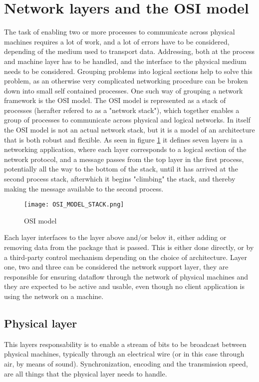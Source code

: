 \section{Network layers and the OSI model}
The task of enabling two or more processes to communicate across physical machines requires a lot of work, and a lot of errors have to be considered, depending of the medium used to transport data. Addressing, both at the process and machine layer has to be handled, and the interface to the physical medium needs to be considered. Grouping problems into logical sections help to solve this problem, as an otherwise very complicated networking procedure can be broken down into small self contained processes.
One such way of grouping a network framework is the OSI model. The OSI model is represented as a stack of processes (herafter refered to as a "network stack"), which together enables a group of processes to communicate across physical and logical networks.
In itself the OSI model is not an actual network stack, but it is a model of an architecture that is both robust and flexible. 
As seen in figure \ref{fig:osi_model_stack} it defines seven layers in a networking application, where each layer corresponds to a logical section of the network protocol, and a message passes from the top layer in the first process, potentially all the way to the bottom of the stack, until it has arrived at the second process stack, afterwhich it begins "climbing" the stack, and thereby making the message available to the second process.
\begin{figure}[htb]
	\begin{center}
	\texttt{[image: OSI\_MODEL\_STACK.png]} %
	\caption{OSI model}
	\label{fig:osi_model_stack}			%
	\end{center}
\end{figure}
Each layer interfaces to the layer above and/or belov it, either adding or removing data from the package that is passed. This is either done directly, or by a third-party control mechanism depending on the choice of architecture.
Layer one, two and three can be considered the network support layer, they are responsible for ensuring dataflow through the network of physical machines and they are expected to be active and usable, even though no client application is using the network on a machine.

\subsection{Physical layer}
This layers responsability is to enable a stream of bits to be broadcast between physical machines, typically through an electrical wire (or in this case through air, by means of sound). Synchronization, encoding and the transmission speed, are all things that the physical layer needs to handle.

